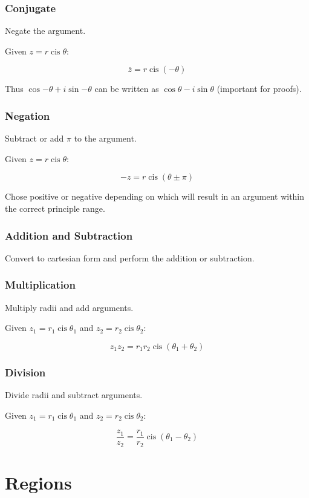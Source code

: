 \documentclass[a4paper,11pt]{report}
\DeclareMathOperator\cis{cis}
\begin{document}
\subsubsection{Conjugate}

Negate the argument.

Given $z = r \cis{\theta}$:

$$
\overline{z} = r \cis(-\theta)
$$

Thus $\cos{-\theta} + i\sin{-\theta}$ can be written as
$\cos{\theta} - i\sin{\theta}$ (important for proofs).

\subsubsection{Negation}

Subtract or add $\pi$ to the argument.

Given $z = r \cis{\theta}$:

$$
-z = r \cis(\theta \pm \pi)
$$

Chose positive or negative depending on which will result in an argument within
the correct principle range.

\subsubsection{Addition and Subtraction}

Convert to cartesian form and perform the addition or subtraction.

\subsubsection{Multiplication}

Multiply radii and add arguments.

Given $z_1 = r_1 \cis{\theta_1}$ and $z_2 = r_2 \cis{\theta_2}$:

$$
z_1 z_2 = r_1 r_2 \cis(\theta_1 + \theta_2)
$$

\subsubsection{Division}

Divide radii and subtract arguments.

Given $z_1 = r_1 \cis{\theta_1}$ and $z_2 = r_2 \cis{\theta_2}$:

$$
\frac{z_1}{z_2} = \frac{r_1}{r_2} \cis(\theta_1 - \theta_2)
$$


\section{Regions}
\end{document}

